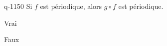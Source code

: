 \begin{truefalse}{q-1150}
Si $f$ est périodique, alors $g\circ f$ est périodique.
\item* Vrai
\item Faux
\end{truefalse}

